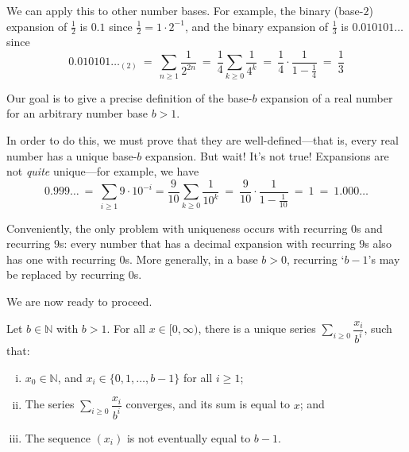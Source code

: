 We can apply this to other number bases. For example, the binary (base-$2$) expansion of $\frac{1}{2}$ is $0.1$ since $\frac{1}{2} = 1 \cdot 2^{-1}$, and the binary expansion of $\frac{1}{3}$ is $0.010101\dots{}$ since
\[ 0.010101\dots{}_{(2)} ~=~ \sum_{n \ge 1} \frac{1}{2^{2n}} ~=~ \frac{1}{4} \sum_{k \ge 0} \frac{1}{4^k} ~=~ \frac{1}{4} \cdot \frac{1}{1-\frac{1}{4}} ~=~ \frac{1}{3} \]

Our goal is to give a precise definition of the base-$b$ expansion of a real number for an arbitrary number base $b > 1$.

In order to do this, we must prove that they are well-defined---that is, every real number has a unique base-$b$ expansion. But wait! It's not true! Expansions are not \textit{quite} unique---for example, we have
\[ 0.999\dots{} ~=~ \sum_{i \ge 1} 9 \cdot 10^{-i} = \dfrac{9}{10} \sum_{k \ge 0} \dfrac{1}{10^k} ~=~ \dfrac{9}{10} \cdot \dfrac{1}{1-\frac{1}{10}} ~=~ 1 ~=~ 1.000\dots{} \]

Conveniently, the only problem with uniqueness occurs with recurring $0$s and recurring $9$s: every number that has a decimal expansion with recurring $9$s also has one with recurring $0$s. More generally, in a base $b>0$, recurring `$b-1$'s may be replaced by recurring $0$s.

We are now ready to proceed.

\begin{theorem}
\label{thmBaseBExpansionsOfReals}
Let $b \in \mathbb{N}$ with $b > 1$. For all $x \in [0,\infty)$, there is a unique series $\displaystyle \sum_{i \ge 0} \dfrac{x_i}{b^i}$, such that:
\begin{enumerate}[(i)]
\item $x_0 \in \mathbb{N}$, and $x_i \in \{ 0, 1, \dots, b-1 \}$ for all $i \ge 1$;
\item The series $\displaystyle \sum_{i \ge 0} \dfrac{x_i}{b^i}$ converges, and its sum is equal to $x$; and
\item The sequence $(x_i)$ is not eventually equal to $b-1$.
\end{enumerate}
\end{theorem}

